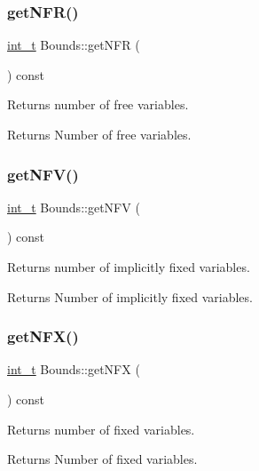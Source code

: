 \subsubsection{\texorpdfstring{get\+N\+F\+R()}{getNFR()}}
{\footnotesize\ttfamily \hyperlink{_types_8hpp_ab6fd6105e64ed14a0c9281326f05e623}{int\+\_\+t} Bounds\+::get\+N\+FR (\begin{DoxyParamCaption}{ }\end{DoxyParamCaption}) const\hspace{0.3cm}{\ttfamily [inline]}}

Returns number of free variables. \begin{DoxyReturn}{Returns}
Number of free variables. 
\end{DoxyReturn}
\mbox{\label{class_bounds_a05acda6c3a05e943824fd08933d4074a}} 
\subsubsection{\texorpdfstring{get\+N\+F\+V()}{getNFV()}}
{\footnotesize\ttfamily \hyperlink{_types_8hpp_ab6fd6105e64ed14a0c9281326f05e623}{int\+\_\+t} Bounds\+::get\+N\+FV (\begin{DoxyParamCaption}{ }\end{DoxyParamCaption}) const\hspace{0.3cm}{\ttfamily [inline]}}

Returns number of implicitly fixed variables. \begin{DoxyReturn}{Returns}
Number of implicitly fixed variables. 
\end{DoxyReturn}
\mbox{\label{class_bounds_ae1b40d3aec87bd2ee9d03e3c0d2aeb0c}} 
\subsubsection{\texorpdfstring{get\+N\+F\+X()}{getNFX()}}
{\footnotesize\ttfamily \hyperlink{_types_8hpp_ab6fd6105e64ed14a0c9281326f05e623}{int\+\_\+t} Bounds\+::get\+N\+FX (\begin{DoxyParamCaption}{ }\end{DoxyParamCaption}) const\hspace{0.3cm}{\ttfamily [inline]}}

Returns number of fixed variables. \begin{DoxyReturn}{Returns}
Number of fixed variables. 
\end{DoxyReturn}
\mbox{\label{class_bounds_a0ce0865020cd26cd38f24e1b2d692fd0}} 
